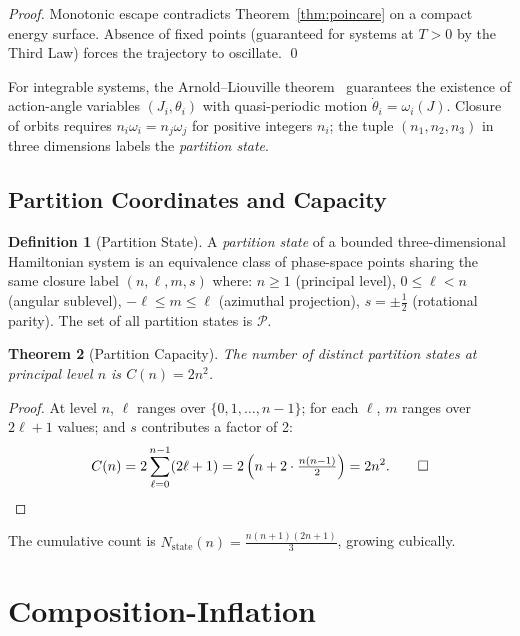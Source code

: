 \documentclass[twocolumn,10pt,a4paper]{article}
\theoremstyle{thmstyle}
\newtheorem{theorem}{Theorem}[section]
\theoremstyle{definition}
\newtheorem{definition}[theorem]{Definition}
\theoremstyle{remark}
\newcommand{\Parts}{\mathcal{P}}
\begin{document}
\begin{proof}
Monotonic escape contradicts Theorem~\ref{thm:poincare} on a compact
energy surface. Absence of fixed points (guaranteed for systems at
$T > 0$ by the Third Law) forces the trajectory to oscillate. \qed
\end{proof}

For integrable systems, the Arnold--Liouville theorem~\citep{arnold1989methods}
guarantees the existence of action-angle variables $(J_i, \theta_i)$
with quasi-periodic motion $\dot\theta_i = \omega_i(J)$. Closure of
orbits requires $n_i \omega_i = n_j \omega_j$ for positive integers
$n_i$; the tuple $(n_1, n_2, n_3)$ in three dimensions labels the
\emph{partition state}.

\subsection{Partition Coordinates and Capacity}

\begin{definition}[Partition State]
A \emph{partition state} of a bounded three-dimensional Hamiltonian
system is an equivalence class of phase-space points sharing the same
closure label $(n, \ell, m, s)$ where:
$n \geq 1$ (principal level), $0 \leq \ell < n$ (angular sublevel),
$-\ell \leq m \leq \ell$ (azimuthal projection), $s = \pm\tfrac12$
(rotational parity). The set of all partition states is $\Parts$.
\end{definition}

\begin{theorem}[Partition Capacity]
\label{thm:capacity}
The number of distinct partition states at principal level $n$ is
$C(n) = 2n^2$.
\end{theorem}

\begin{proof}
At level $n$, $\ell$ ranges over $\{0,1,\ldots,n-1\}$; for each $\ell$,
$m$ ranges over $2\ell + 1$ values; and $s$ contributes a factor of 2:
\[
C(n) = 2\sum_{\ell=0}^{n-1}(2\ell+1) = 2\left(n + 2\cdot\tfrac{n(n-1)}{2}\right) = 2n^2.\qed
\]
\end{proof}

The cumulative count is $N_{\mathrm{state}}(n) = \tfrac{n(n+1)(2n+1)}{3}$,
growing cubically.

\section{Composition-Inflation}
\label{sec:inflation}
\end{document}

